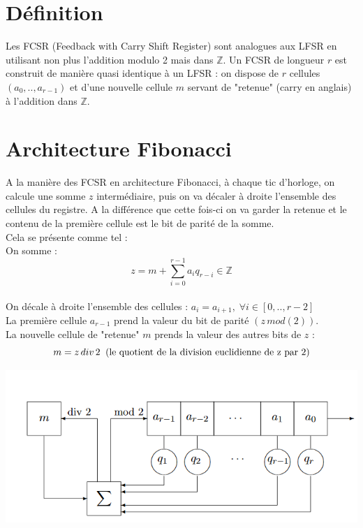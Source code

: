 \documentclass[11pt]{report}
\begin{document}
\section{Définition}
Les FCSR (Feedback with Carry Shift Register) sont analogues aux LFSR en utilisant non plus l'addition modulo 2 mais dans $\mathbb{Z}$.
Un FCSR de longueur $r$ est construit de manière quasi identique à un LFSR : on dispose de $r$ cellules $(a_0,..,a_{r-1})$ et d'une nouvelle cellule $m$ servant de "retenue" (carry en anglais) à l'addition dans $\mathbb{Z}$.

\section{Architecture Fibonacci}
A la manière des FCSR en architecture Fibonacci, à chaque tic d'horloge, on calcule une somme $z$ intermédiaire, puis on va décaler à droite l'ensemble des cellules du registre. A la différence que cette fois-ci on va garder la retenue et le contenu de la première cellule est le bit de parité de la somme.  
\\
Cela se présente comme tel : 
\\
On somme : 
\[
z= m + \sum_{i=0}^{r-1} a_iq_{r-i} \in \mathbb{Z}
\]
\\
On décale à droite l'ensemble des cellules : 
$a_i = a_{i+1},\; \forall i \in [0,..,r-2]$
\\
La première cellule $a_{r-1}$ prend la valeur du bit de parité $(z \,mod(2))$. 
\\
La nouvelle cellule de "retenue" $m$ prends la valeur des autres bits de $z$ : 
\[
 	m = z\, div \,2 \;\; \textnormal{(le quotient de la division euclidienne de z par 2)}
\]

\begin{center}
	
	\includegraphics[scale=0.7]{FiboFCSR.png}
	\label{FCSRFibo}

\end{center}
\end{document}
